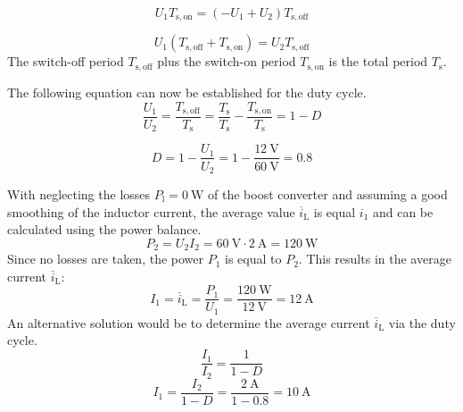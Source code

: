 \begin{solutionblock}
    \begin{equation}
        U_{\mathrm{1}}T_{\mathrm{s,on}}= (-U_{\mathrm{1}}+U_{\mathrm{2}})T_{\mathrm{s,off}}
    \end{equation}

    \begin{equation}
        U_{\mathrm{1}}(T_{\mathrm{s,off}}+T_{\mathrm{s,on}})=  U_{\mathrm{2}}T_{\mathrm{s,off}}
    \end{equation}
    The switch-off period $T_{\mathrm{s,off}}$ plus the switch-on period $T_{\mathrm{s,on}}$ is the total period $T_{\mathrm{s}}$.

    The following equation can now be established for the duty cycle.
    \begin{equation}
        \frac{U_{\mathrm{1}}}{U_{\mathrm{2}}}= \frac{T_{\mathrm{s,off}}}{T_{\mathrm{s}}}= \frac{T_{\mathrm{s}}}{T_{\mathrm{s}}}-\frac{T_{\mathrm{s,on}}}{T_{\mathrm{s}}} = 1-D
    \end{equation}

    \begin{equation}
        D = 1-\frac{U_{\mathrm{1}}}{U_{\mathrm{2}}} = 1- \frac {\SI{12}{\volt}} {\SI{60}{\volt}} = 0.8
    \end{equation}
\end{solutionblock}


\begin{solutionblock}
    With neglecting the losses $P_{\mathrm{l}} = \SI{0}{\watt}$ of the boost converter and assuming a good smoothing of the inductor current, the average value $\overline i_{\mathrm{L}}$ is equal $i_{\mathrm{1}}$ and can be calculated using the power balance.
    \begin{equation}
        P_{\mathrm{2}} = U_{\mathrm{2}} I_{\mathrm{2}} = {\SI{60}{\volt}} \cdot {\SI{2}{\ampere}} = {\SI{120}{\watt}}
    \end{equation}
    Since no losses are taken, the power  $P_{\mathrm{1}}$ is equal to  $P_{\mathrm{2}}$.
    This results in the average current $\overline i_{\mathrm{L}}$:
    \begin{equation}
         I_{\mathrm{1}} = \overline i_{\mathrm{L}} = \frac{P_{\mathrm{1}}}{U_{\mathrm{1}}}= \frac{\SI{120}{\watt}}{\SI{12}{\volt}} = \SI{12}{\ampere}
    \end{equation}
    An alternative solution would be to determine the average current $\overline i_{\mathrm{L}}$ via the duty cycle.
    \begin{equation}
    \frac{I_{\mathrm{1}}}{I_{\mathrm{2}}}=\frac{1}{1-D}
    \end{equation}
    \begin{equation}
     I_{\mathrm{1}}=\frac{I_{\mathrm{2}}}{1-D}=\frac{\SI{2}{\ampere}}{1-0.8}= \SI{10}{\ampere}
    \end{equation}
\end{solutionblock}

